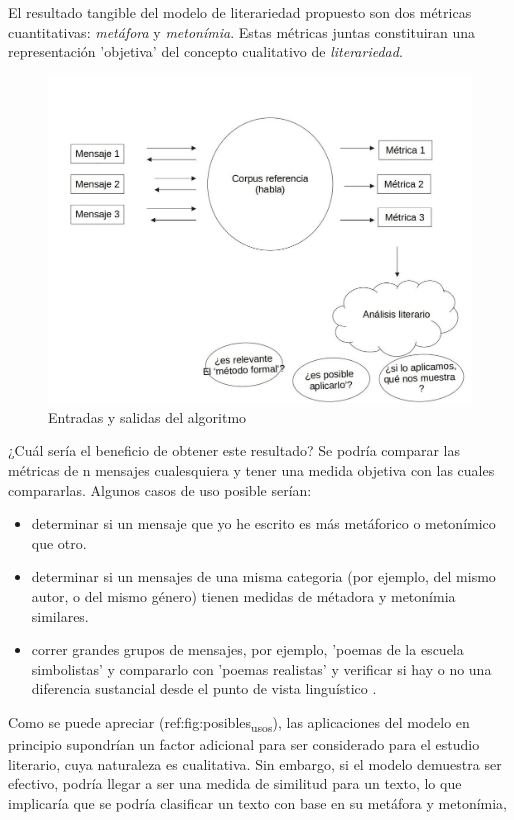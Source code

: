 \documentclass[12pt,letterpaper,twoside]{article}
\begin{document}
El resultado tangible del modelo de literariedad propuesto son dos
métricas cuantitativas: \emph{metáfora} y \emph{metonímia}.  Estas métricas
juntas constituiran una representación 'objetiva' del concepto
cualitativo de \emph{literariedad}.

\begin{figure}[htbp]
\centering
\includegraphics[width=.9\linewidth]{./assets/posibles_usos.jpg}
\caption{\label{fig:posibles_usos}Entradas y salidas del algoritmo}
\end{figure}


¿Cuál sería el beneficio de obtener este resultado? Se podría
comparar las métricas de n mensajes cualesquiera y tener una
medida objetiva con las cuales compararlas. Algunos casos de uso
posible serían:

\begin{itemize}
\item determinar si un mensaje que yo he escrito es más metáforico o
metonímico que otro.

\item determinar si un mensajes de una misma categoria (por ejemplo,
del mismo autor, o del mismo género) tienen medidas de métadora
y metonímia similares.

\item correr grandes grupos de mensajes, por ejemplo, 'poemas de la
escuela simbolistas' y compararlo con 'poemas realistas' y
verificar si hay o no una diferencia sustancial desde el punto
de vista linguístico .
\end{itemize}

Como se puede apreciar (ref:fig:posibles\textsubscript{usos}), las aplicaciones
del modelo en principio supondrían un factor adicional para ser
considerado para el estudio literario, cuya naturaleza es
cualitativa. Sin embargo, si el modelo demuestra ser efectivo,
podría llegar a ser una medida de similitud para un texto, lo que
implicaría que se podría clasificar un texto con base en su
metáfora y metonímia,
\end{document}
